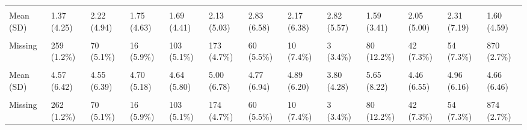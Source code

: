 \documentclass[
  single column]{article}
\begin{document}
\begin{landscape}
\begin{longtable}[t]{lllllllllllll}
\cellcolor{gray!10}{Hours Spent on Charity per Week} & \cellcolor{gray!10}{} & \cellcolor{gray!10}{} & \cellcolor{gray!10}{} & \cellcolor{gray!10}{} & \cellcolor{gray!10}{} & \cellcolor{gray!10}{} & \cellcolor{gray!10}{} & \cellcolor{gray!10}{} & \cellcolor{gray!10}{} & \cellcolor{gray!10}{} & \cellcolor{gray!10}{} & \cellcolor{gray!10}{}\\
Mean (SD) & 1.37 (4.25) & 2.22 (4.94) & 1.75 (4.63) & 1.69 (4.41) & 2.13 (5.03) & 2.83 (6.58) & 2.17 (6.38) & 2.82 (5.57) & 1.59 (3.41) & 2.05 (5.00) & 2.31 (7.19) & 1.60 (4.59)\\
\cellcolor{gray!10}{Median [Min, Max]} & \cellcolor{gray!10}{0 [0, 100]} & \cellcolor{gray!10}{0 [0, 60.0]} & \cellcolor{gray!10}{0 [0, 45.0]} & \cellcolor{gray!10}{0 [0, 50.0]} & \cellcolor{gray!10}{0 [0, 100]} & \cellcolor{gray!10}{0 [0, 100]} & \cellcolor{gray!10}{0 [0, 56.0]} & \cellcolor{gray!10}{0 [0, 30.0]} & \cellcolor{gray!10}{0 [0, 25.0]} & \cellcolor{gray!10}{0 [0, 52.0]} & \cellcolor{gray!10}{0 [0, 100]} & \cellcolor{gray!10}{0 [0, 100]}\\
\addlinespace
Missing & 259 (1.2\%) & 70 (5.1\%) & 16 (5.9\%) & 103 (5.1\%) & 173 (4.7\%) & 60 (5.5\%) & 10 (7.4\%) & 3 (3.4\%) & 80 (12.2\%) & 42 (7.3\%) & 54 (7.3\%) & 870 (2.7\%)\\
\cellcolor{gray!10}{Commute Hours per Week} & \cellcolor{gray!10}{} & \cellcolor{gray!10}{} & \cellcolor{gray!10}{} & \cellcolor{gray!10}{} & \cellcolor{gray!10}{} & \cellcolor{gray!10}{} & \cellcolor{gray!10}{} & \cellcolor{gray!10}{} & \cellcolor{gray!10}{} & \cellcolor{gray!10}{} & \cellcolor{gray!10}{} & \cellcolor{gray!10}{}\\
Mean (SD) & 4.57 (6.42) & 4.55 (6.39) & 4.70 (5.18) & 4.64 (5.80) & 5.00 (6.78) & 4.77 (6.94) & 4.89 (6.20) & 3.80 (4.28) & 5.65 (8.22) & 4.46 (6.55) & 4.96 (6.16) & 4.66 (6.46)\\
\cellcolor{gray!10}{Median [Min, Max]} & \cellcolor{gray!10}{3.00 [0, 160]} & \cellcolor{gray!10}{3.00 [0, 100]} & \cellcolor{gray!10}{3.00 [0, 40.0]} & \cellcolor{gray!10}{3.00 [0, 100]} & \cellcolor{gray!10}{3.50 [0, 100]} & \cellcolor{gray!10}{3.00 [0, 100]} & \cellcolor{gray!10}{3.75 [0, 50.0]} & \cellcolor{gray!10}{3.00 [0, 25.0]} & \cellcolor{gray!10}{3.50 [0, 100]} & \cellcolor{gray!10}{3.00 [0, 80.0]} & \cellcolor{gray!10}{3.00 [0, 60.0]} & \cellcolor{gray!10}{3.00 [0, 160]}\\
Missing & 262 (1.2\%) & 70 (5.1\%) & 16 (5.9\%) & 103 (5.1\%) & 174 (4.7\%) & 60 (5.5\%) & 10 (7.4\%) & 3 (3.4\%) & 80 (12.2\%) & 42 (7.3\%) & 54 (7.3\%) & 874 (2.7\%)\\

\end{longtable}
\end{landscape}
\end{document}
